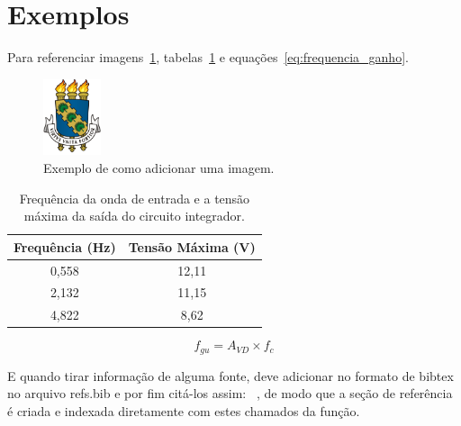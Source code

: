\section*{Exemplos}


Para referenciar imagens~\ref{fig:brasao_UFC}, tabelas~\ref{tab:frequencia_tensao} e equações~\ref{eq:frequencia_ganho}.

\begin{figure}[!ht]
    \centering
    \includegraphics[width=0.15\textwidth]{adj/brasao.png}
    \caption{Exemplo de como adicionar uma imagem.}
    \label{fig:brasao_UFC}
\end{figure}

\begin{table}[!ht]
    \centering
    \begin{tabular}{|c|c|}
    \hline
    Frequência (Hz) & Tensão Máxima (V) \\ \hline
    0,558            & 12,11            \\ \hline
    2,132            & 11,15            \\ \hline
    4,822            & 8,62             \\ \hline
    \end{tabular}
    \caption{Frequência da onda de entrada e a tensão máxima da saída do circuito integrador.}
    \label{tab:frequencia_tensao}
\end{table}

\begin{equation}
    f_{gu} = A_{VD}\times f_{c}
    \label{eq:frequencia_ganho}
\end{equation}

E quando tirar informação de alguma fonte, deve adicionar no formato de bibtex no arquivo refs.bib e por fim citá-los assim:~\cite{Sedra} \cite{Boylestad} \cite{Fonseca}, de modo que a seção de referência é criada e indexada diretamente com estes chamados da função.

\clearpage